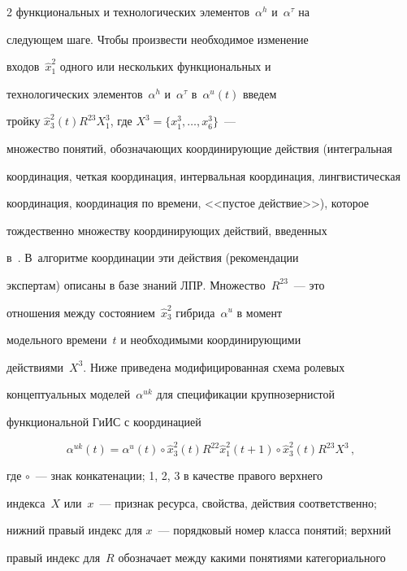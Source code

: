 \begin{multicols}{2}
функциональных и технологических элементов~$\alpha^h$ и~$\alpha^\tau$ на 


следующем шаге. Чтобы произвести необходимое изменение 


входов~$\hat{x}_1^2$ одного или нескольких функциональных и 


технологических элементов~$\alpha^h$ и~$\alpha^\tau$ в~$\alpha^u(t)$ введем 


тройку $\hat{x}_3^2(t) R^{23} X_1^3$, где $X^3=\{x_1^3, \ldots , x_6^3\}$~---\linebreak 


множество понятий, обозначающих ко\-ор\-ди\-ни\-ру\-ющие действия (интегральная 


координация, четкая координация, интервальная координация, лингвистическая 


координация, координация по времени, <<пустое действие>>), которое 


тождественно множеству координирующих действий, введенных 


в~\cite{15kol}. В~алгоритме координации эти действия (рекомендации 


экспертам) описаны в базе знаний ЛПР. Множество~$R^{23}$~--- это 


отношения между состоянием~$\hat{x}_3^2$ гибрида~$\alpha^u$ в момент 


модельного времени~$t$ и необходимыми координирующими 


действиями~$X^3$. Ниже приведена модифицированная схема ролевых 


концептуальных моделей~$\alpha^{uk}$ для спецификации крупнозернистой 


функциональной ГиИС с координацией


\begin{equation}


\alpha^{uk}(t)= \alpha^u(t)\circ \hat{x}_3^2(t) R^{22} \hat{x}_1^2(t+1)\circ \hat{x}_3^2(t) R^{23} X^3\,,


\label{e3kol}


\end{equation}


где $\circ$~--- знак конкатенации; 1, 2, 3 в качестве правого верхнего 


индекса~$X$ или~$x$~--- признак ресурса, свойства, действия соответственно; 


нижний правый индекс для $x$~--- порядковый номер класса понятий; верхний 


правый индекс для~$R$ обозначает между какими понятиями категориального 



\end{multicols}
